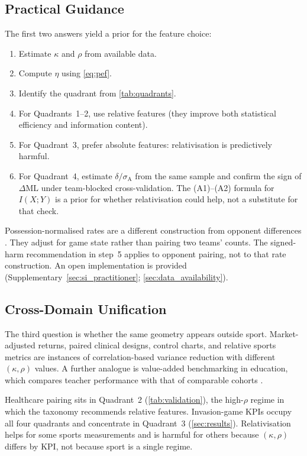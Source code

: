 \subsection{Practical Guidance}
\label{sec:practical_guidance}

The first two answers yield a prior for the feature choice:
\begin{enumerate}
  \item Estimate $\kappa$ and $\rho$ from available data.
  \item Compute $\eta$ using \cref{eq:pef}.
  \item Identify the quadrant from \cref{tab:quadrants}.
  \item For Quadrants~1--2, use relative features (they improve both statistical efficiency and information content).
  \item For Quadrant~3, prefer absolute features: relativisation is predictively harmful.
  \item For Quadrant~4, estimate $\delta/\sigma_{\mathrm{A}}$ from the same sample and confirm the sign of $\Delta\mathrm{ML}$ under team-blocked cross-validation. The (A1)--(A2) formula for $I(X;Y)$ is a prior for whether relativisation could help, not a substitute for that check.
\end{enumerate}
Possession-normalised rates are a different construction from opponent differences \parencite{sever2026}. They adjust for game state rather than pairing two teams' counts. The signed-harm recommendation in step~5 applies to opponent pairing, not to that rate construction. An open implementation is provided (Supplementary~\cref{sec:si_practitioner}; \cref{sec:data_availability}).

\subsection{Cross-Domain Unification}

The third question is whether the same geometry appears outside sport. Market-adjusted returns, paired clinical designs, control charts, and relative sports metrics are instances of correlation-based variance reduction with different $(\kappa,\rho)$ values. A further analogue is value-added benchmarking in education, which compares teacher performance with that of comparable cohorts \parencite{hanushek2010}.

Healthcare pairing sits in Quadrant~2 (\cref{tab:validation}), the high-$\rho$ regime in which the taxonomy recommends relative features. Invasion-game KPIs occupy all four quadrants and concentrate in Quadrant~3 (\cref{sec:results}). Relativisation helps for some sports measurements and is harmful for others because $(\kappa,\rho)$ differs by KPI, not because sport is a single regime.

